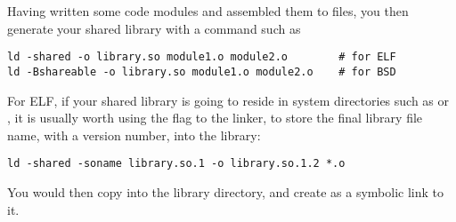 
Having written some code modules and assembled them to  files,
you then generate your shared library with a command such as

\begin{lstlisting}
ld -shared -o library.so module1.o module2.o        # for ELF
ld -Bshareable -o library.so module1.o module2.o    # for BSD
\end{lstlisting}

For ELF, if your shared library is going to reside in system
directories such as  or , it is usually worth
using the  flag to the linker, to store the final
library file name, with a version number, into the library:

\begin{lstlisting}
ld -shared -soname library.so.1 -o library.so.1.2 *.o
\end{lstlisting}

You would then copy  into the library directory,
and create  as a symbolic link to it.
